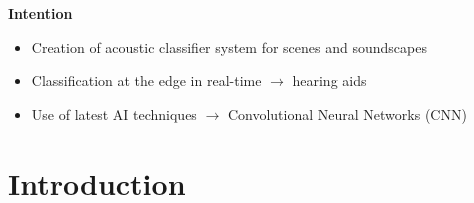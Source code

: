 \documentclass[xcolor=dvipsnames,aspectratio=169,beamer]{beamer}
\begin{document}
\begin{frame}[t]

	\textbf{Intention}
	\begin{itemize}
	\item<1-> Creation of acoustic classifier system for scenes and soundscapes
	\item<2-> Classification at the edge in real-time $\rightarrow$ hearing aids
	\item<3-> Use of latest AI techniques $\rightarrow$ Convolutional Neural Networks (CNN)
	\end{itemize}
	
\end{frame}

\section{Introduction}
\end{document}
